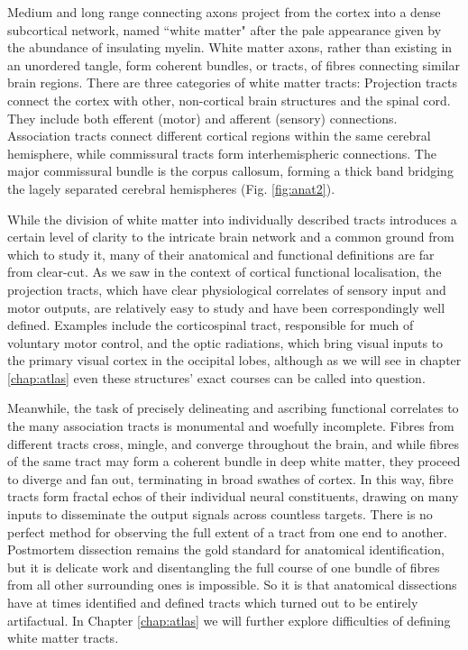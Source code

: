 Medium and long range connecting axons project from the cortex into a dense subcortical network, named ``white matter" after the pale appearance given by the abundance of insulating myelin.
White matter axons, rather than existing in an unordered tangle, form coherent bundles, or tracts, of fibres connecting similar brain regions.
There are three categories of white matter tracts:
Projection tracts connect the cortex with other, non-cortical brain structures and the spinal cord.
They include both efferent (motor) and afferent (sensory) connections.
Association tracts connect different cortical regions within the same cerebral hemisphere, while commissural tracts form interhemispheric connections.
The major commissural bundle is the corpus callosum, forming a thick band bridging the lagely separated cerebral hemispheres (Fig. \ref{fig:anat2}).

While the division of white matter into individually described tracts introduces a certain level of clarity to the intricate brain network and a common ground from which to study it, many of their anatomical and functional definitions are far from clear-cut.
As we saw in the context of cortical functional localisation, the projection tracts, which have clear physiological correlates of sensory input and motor outputs, are relatively easy to study and have been correspondingly well defined.
Examples include the corticospinal tract, responsible for much of voluntary motor control, and the optic radiations, which bring visual inputs to the primary visual cortex in the occipital lobes, although as we will see in chapter \ref{chap:atlas} even these structures' exact courses can be called into question.

Meanwhile, the task of precisely delineating and ascribing functional correlates to the many association tracts is monumental and woefully incomplete.
Fibres from different tracts cross, mingle, and converge throughout the brain, and while fibres of the same tract may form a coherent bundle in deep white matter, they proceed to diverge and fan out, terminating in broad swathes of cortex.
In this way, fibre tracts form fractal echos of their individual neural constituents, drawing on many inputs to disseminate the output signals across countless targets.
There is no perfect method for observing the full extent of a tract from one end to another.
Postmortem dissection remains the gold standard for anatomical identification, but it is delicate work and disentangling the full course of one bundle of fibres from all other surrounding ones is impossible.
So it is that anatomical dissections have at times identified and defined tracts which turned out to be entirely artifactual.
In Chapter \ref{chap:atlas} we will further explore difficulties of defining white matter tracts.

